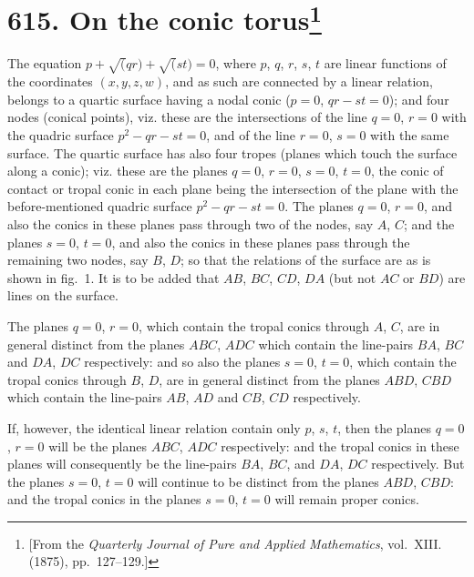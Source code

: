 \documentclass[11pt,a4paper]{article}
\theoremstyle{plain}
\theoremstyle{definition}
\theoremstyle{remark}
\begin{document}
\newpage
\section[On the conic torus]{\textbf{615.} On the conic torus\footnote{[From the \textit{Quarterly Journal of Pure and Applied Mathematics}, vol.~XIII. (1875), pp.~127--129.]}}

The equation $p + \surd(qr) + \surd(st) = 0$, where $p$, $q$, $r$, $s$, $t$ are linear functions of the coordinates $(x, y, z, w)$, and as such are connected by a linear relation, belongs to a quartic surface having a nodal conic ($p = 0$, $qr - st = 0$); and four nodes (conical points), viz. these are the intersections of the line $q = 0$, $r = 0$ with the quadric surface $p^2 - qr - st = 0$, and of the line $r = 0$, $s = 0$ with the same surface. The quartic surface has also four tropes (planes which touch the surface along a conic); viz. these are the planes $q = 0$, $r = 0$, $s = 0$, $t = 0$, the conic of contact or tropal conic in each plane being the intersection of the plane with the before-mentioned quadric surface $p^2 - qr - st = 0$. The planes $q = 0$, $r = 0$, and also the conics in these planes pass through two of the nodes, say $A$, $C$; and the planes $s = 0$, $t = 0$, and also the conics in these planes pass through the remaining two nodes, say $B$, $D$; so that the relations of the surface are as is shown in fig.~1. It is to be added that $AB$, $BC$, $CD$, $DA$ (but not $AC$ or $BD$) are lines on the surface.

The planes $q = 0$, $r = 0$, which contain the tropal conics through $A$, $C$, are in general distinct from the planes $ABC$, $ADC$ which contain the line-pairs $BA$, $BC$ and $DA$, $DC$ respectively: and so also the planes $s = 0$, $t = 0$, which contain the tropal conics through $B$, $D$, are in general distinct from the planes $ABD$, $CBD$ which contain the line-pairs $AB$, $AD$ and $CB$, $CD$ respectively.

If, however, the identical linear relation contain only $p$, $s$, $t$, then the planes $q = 0$, $r = 0$ will be the planes $ABC$, $ADC$ respectively: and the tropal conics in these planes will consequently be the line-pairs $BA$, $BC$, and $DA$, $DC$ respectively. But the planes $s = 0$, $t = 0$ will continue to be distinct from the planes $ABD$, $CBD$: and the tropal conics in the planes $s = 0$, $t = 0$ will remain proper conics.
\end{document}
